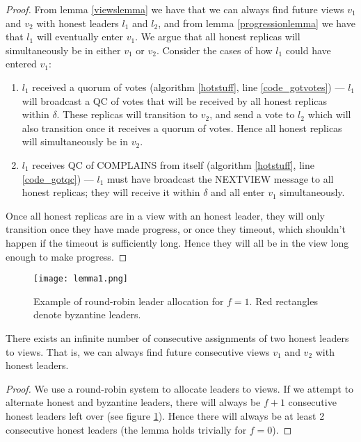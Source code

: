 \begin{proof}
	From lemma \ref{viewslemma} we have that we can always find future views $v_1$ and $v_2$ with honest leaders $l_1$ and $l_2$, and from lemma \ref{progressionlemma} we have that $l_1$ will eventually enter $v_1$. We argue that all honest replicas will simultaneously be in either $v_1$ or $v_2$. Consider the cases of how $l_1$ could have entered $v_1$:
	\begin{enumerate}
		\item $l_1$ received a quorum of votes (algorithm \ref{hotstuff}, line \ref{code_gotvotes}) --- $l_1$ will broadcast a QC of votes that will be received by all honest replicas within $\delta$. These replicas will transition to $v_2$, and send a vote to $l_2$ which will also transition once it receives a quorum of votes. Hence all honest replicas will simultaneously be in $v_2$.
		\item $l_1$ receives QC of COMPLAINS from itself (algorithm \ref{hotstuff}, line \ref{code_gotqc}) --- $l_1$ must have broadcast the NEXT{\large V}IEW message to all honest replicas; they will receive it within $\delta$ and all enter $v_1$ simultaneously.
	\end{enumerate}
	Once all honest replicas are in a view with an honest leader, they will only transition once they have made progress, or once they timeout, which shouldn't happen if the timeout is sufficiently long. Hence they will all be in the view long enough to make progress.
\end{proof}

\begin{figure}[h!]
	\centering
	\texttt{[image: lemma1.png]}
	\caption{Example of round-robin leader allocation for $f = 1$. Red rectangles denote byzantine leaders.}
	\label{lemma1diagram}
\end{figure}

\begin{lemma} \label{viewslemma}
	There exists an infinite number of consecutive assignments of two honest leaders to views. That is, we can always find future consecutive views $v_1$ and $v_2$ with honest leaders.
\end{lemma}

\begin{proof}
	We use a round-robin system to allocate leaders to views. If we attempt to alternate honest and byzantine leaders, there will always be $f + 1$ consecutive honest leaders left over (see figure \ref{lemma1diagram}). Hence there will always be at least 2 consecutive honest leaders (the lemma holds trivially for $f = 0$).
\end{proof}


